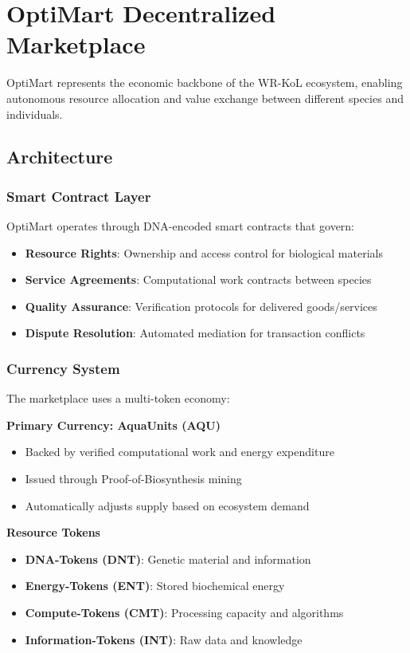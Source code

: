 \documentclass[11pt,a4paper]{article}
\begin{document}
\section{OptiMart Decentralized Marketplace}

OptiMart represents the economic backbone of the WR-KoL ecosystem, enabling autonomous resource allocation and value exchange between different species and individuals.

\subsection{Architecture}

\subsubsection{Smart Contract Layer}
OptiMart operates through DNA-encoded smart contracts that govern:
\begin{itemize}
    \item \textbf{Resource Rights}: Ownership and access control for biological materials
    \item \textbf{Service Agreements}: Computational work contracts between species
    \item \textbf{Quality Assurance}: Verification protocols for delivered goods/services
    \item \textbf{Dispute Resolution}: Automated mediation for transaction conflicts
\end{itemize}

\subsubsection{Currency System}
The marketplace uses a multi-token economy:

\textbf{Primary Currency: AquaUnits (AQU)}
\begin{itemize}
    \item Backed by verified computational work and energy expenditure
    \item Issued through Proof-of-Biosynthesis mining
    \item Automatically adjusts supply based on ecosystem demand
\end{itemize}

\textbf{Resource Tokens}
\begin{itemize}
    \item \textbf{DNA-Tokens (DNT)}: Genetic material and information
    \item \textbf{Energy-Tokens (ENT)}: Stored biochemical energy
    \item \textbf{Compute-Tokens (CMT)}: Processing capacity and algorithms
    \item \textbf{Information-Tokens (INT)}: Raw data and knowledge
\end{itemize}
\end{document}
